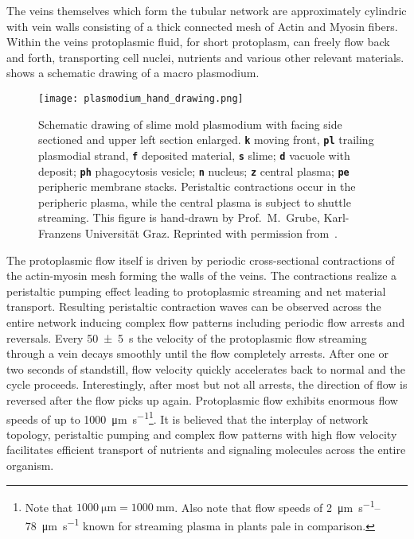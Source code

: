 		
	
		The veins themselves which form the tubular network are approximately cylindric with vein walls consisting of a thick connected mesh of Actin and Myosin fibers. Within the veins protoplasmic fluid, for short protoplasm, can freely flow back and forth, transporting cell nuclei, nutrients and various other relevant materials.  shows a schematic drawing of a macro plasmodium.

		\begin{figure}[!htb]
			\centering
			\texttt{[image: plasmodium\_hand\_drawing.png]}
			\caption[Schematic drawing of the plasmodium of \P]{Schematic drawing of slime mold plasmodium with facing side sectioned and upper left section enlarged. \textbf{\texttt{k}} moving front, \textbf{\texttt{pl}} trailing plasmodial strand, \textbf{\texttt{f}} deposited material, \textbf{\texttt{s}} slime; \textbf{\texttt{d}} vacuole with deposit; \textbf{\texttt{ph}} phagocytosis vesicle; \textbf{\texttt{n}} nucleus; \textbf{\texttt{z}} central plasma; \textbf{\texttt{pe}} peripheric membrane stacks. Peristaltic contractions occur in the peripheric plasma, while the central plasma is subject to shuttle streaming. This figure is hand-drawn by Prof.~M.~Grube, Karl-Franzens Universit\"at Graz. Reprinted with permission from~\cite{grube2016physarum}.}
			\label{fig:plasmodium_hand_drawing}
		\end{figure}

		The protoplasmic flow itself is driven by periodic cross-sectional contractions of the actin-myosin mesh forming the walls of the veins. The contractions realize a peristaltic pumping effect leading to protoplasmic streaming and net material transport. Resulting peristaltic contraction waves can be observed across the entire network inducing complex flow patterns including periodic flow arrests and reversals. Every \SI{50 \pm 5}{\second} the velocity of the protoplasmic flow streaming through a vein decays smoothly until the flow completely arrests. After one or two seconds of standstill, flow velocity quickly accelerates back to normal and the cycle proceeds. Interestingly, after most but not all arrests, the direction of flow is reversed after the flow picks up again. Protoplasmic flow exhibits enormous flow speeds of up to \SI[per-mode=symbol]{1000}{\micro\metre\per\second}\footnote{Note that $\SI{1000}{\micro\metre} = \SI{1000}{\milli\metre}$. Also note that flow speeds of \SIrange[per-mode=symbol]{2}{78}{\micro\metre\per\second} known for streaming plasma in plants pale in comparison.}. It is believed that the interplay of network topology, peristaltic pumping and complex flow patterns with high flow velocity facilitates efficient transport of nutrients and signaling molecules across the entire organism. 

